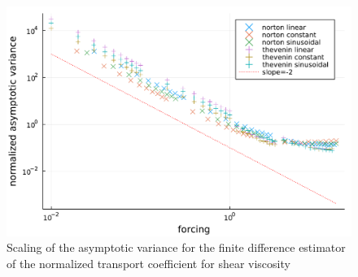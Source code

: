 \begin{figure}[htbp]
    \begin{center}
      \includegraphics[width=0.9\linewidth]{figures/norton_sv_avs.pdf}
      \caption{ \label{fig:norton_avs_sv}
        Scaling of the asymptotic variance for the finite difference estimator of the normalized transport coefficient for shear viscosity}
    \end{center}
  \end{figure}


